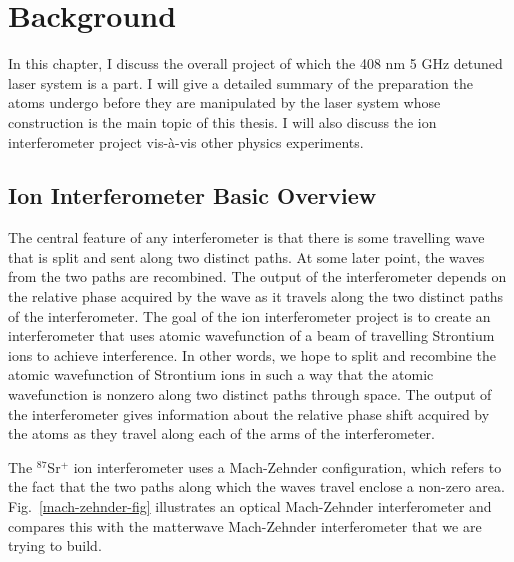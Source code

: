 
\chapter{Background}
In this chapter, I discuss the overall project of which the 408 nm 5 GHz detuned laser system is a part. I will give a detailed summary of the preparation the atoms undergo before they are manipulated by the laser system whose construction is the main topic of this thesis. I will also discuss the ion interferometer project vis-\`a-vis other physics experiments. 

\section{Ion Interferometer Basic Overview}
The central feature of any interferometer is that there is some travelling wave that is split and sent along two distinct paths. At some later point, the waves from the two paths are recombined. The output of the interferometer depends on the relative phase acquired by the wave as it travels along the two distinct paths of the interferometer.
The goal of the ion interferometer project is to create an interferometer that uses atomic wavefunction of a beam of travelling Strontium ions to achieve interference.
In other words, we hope to split and recombine the atomic wavefunction of Strontium ions in such a way that the atomic wavefunction is nonzero along two distinct paths through space. 
The output of the interferometer gives information about the relative phase shift acquired by the atoms as they travel along each of the arms of the interferometer. 

The $^{87}$Sr$^+$ ion interferometer uses a Mach-Zehnder configuration, which refers to the fact that the two paths along which the waves travel enclose a non-zero area. Fig.\ \ref{mach-zehnder-fig} illustrates an optical Mach-Zehnder interferometer and compares this with the matterwave Mach-Zehnder interferometer that we are trying to build.

